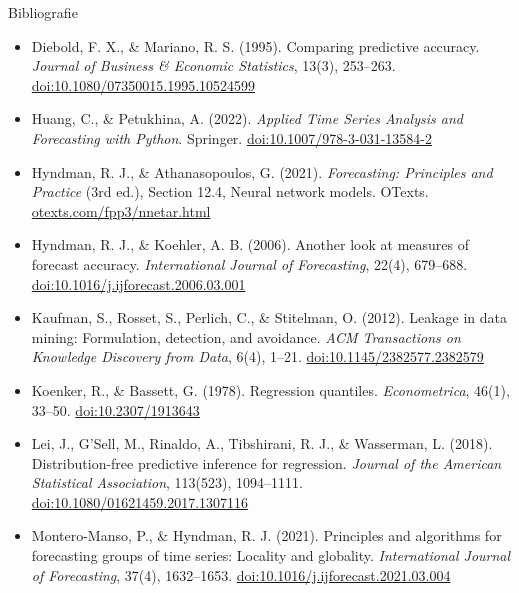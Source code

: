 \begin{frame}{Bibliografie}
\itemsize{\tiny}
\begin{itemize}
    \item Diebold, F. X., \& Mariano, R. S. (1995). Comparing predictive accuracy. \textit{Journal of Business \& Economic Statistics}, 13(3), 253--263. \href{https://doi.org/10.1080/07350015.1995.10524599}{doi:10.1080/07350015.1995.10524599}
    \item Huang, C., \& Petukhina, A. (2022). \textit{Applied Time Series Analysis and Forecasting with Python}. Springer. \href{https://doi.org/10.1007/978-3-031-13584-2}{doi:10.1007/978-3-031-13584-2}
    \item Hyndman, R. J., \& Athanasopoulos, G. (2021). \textit{Forecasting: Principles and Practice} (3rd ed.), Section 12.4, Neural network models. OTexts. \href{https://otexts.com/fpp3/nnetar.html}{otexts.com/fpp3/nnetar.html}
    \item Hyndman, R. J., \& Koehler, A. B. (2006). Another look at measures of forecast accuracy. \textit{International Journal of Forecasting}, 22(4), 679--688. \href{https://doi.org/10.1016/j.ijforecast.2006.03.001}{doi:10.1016/j.ijforecast.2006.03.001}
    \item Kaufman, S., Rosset, S., Perlich, C., \& Stitelman, O. (2012). Leakage in data mining: Formulation, detection, and avoidance. \textit{ACM Transactions on Knowledge Discovery from Data}, 6(4), 1--21. \href{https://doi.org/10.1145/2382577.2382579}{doi:10.1145/2382577.2382579}
    \item Koenker, R., \& Bassett, G. (1978). Regression quantiles. \textit{Econometrica}, 46(1), 33--50. \href{https://doi.org/10.2307/1913643}{doi:10.2307/1913643}
    \item Lei, J., G'Sell, M., Rinaldo, A., Tibshirani, R. J., \& Wasserman, L. (2018). Distribution-free predictive inference for regression. \textit{Journal of the American Statistical Association}, 113(523), 1094--1111. \href{https://doi.org/10.1080/01621459.2017.1307116}{doi:10.1080/01621459.2017.1307116}
    \item Montero-Manso, P., \& Hyndman, R. J. (2021). Principles and algorithms for forecasting groups of time series: Locality and globality. \textit{International Journal of Forecasting}, 37(4), 1632--1653. \href{https://doi.org/10.1016/j.ijforecast.2021.03.004}{doi:10.1016/j.ijforecast.2021.03.004}
\end{itemize}
\end{frame}


